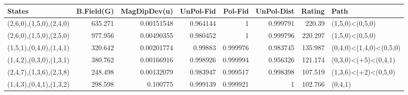 \begin{tabular}{lrrrrrrl}
\hline
 States                  &   B.Field(G) &   MagDipDev(u) &   UnPol-Fid &   Pol-Fid &   UnPol-Dist &   Rating & Path                    \\
\hline
 (2,6,0),(1,5,0),(2,4,0) &      635.271 &     0.00151548 &    0.964144 &  1        &     0.999791 &  220.39  & (1,5,0)<(0,5,0)         \\
 (2,6,0),(1,5,0),(2,5,0) &      977.956 &     0.00490355 &    0.980452 &  1        &     0.999796 &  220.297 & (1,5,0)<(0,5,0)         \\
 (1,5,1),(0,4,0),(1,4,1) &      320.642 &     0.00201774 &    0.99883  &  0.999976 &     0.983745 &  135.987 & (0,4,0)<(1,4,0)<(0,5,0) \\
 (1,4,2),(0,3,0),(1,3,1) &      380.762 &     0.00166916 &    0.998926 &  0.999994 &     0.956326 &  121.174 & (0,3,0)<(+5)<(0,4,1)    \\
 (2,4,7),(1,3,6),(2,3,8) &      248.498 &     0.00132079 &    0.983947 &  0.999517 &     0.998398 &  107.519 & (1,3,6)<(+2)<(0,5,0)    \\
 (1,4,3),(0,4,1),(1,3,2) &      298.598 &     0.100775   &    0.999139 &  0.999921 &     1        &  102.766 & (0,4,1)                 \\
\hline
\end{tabular}